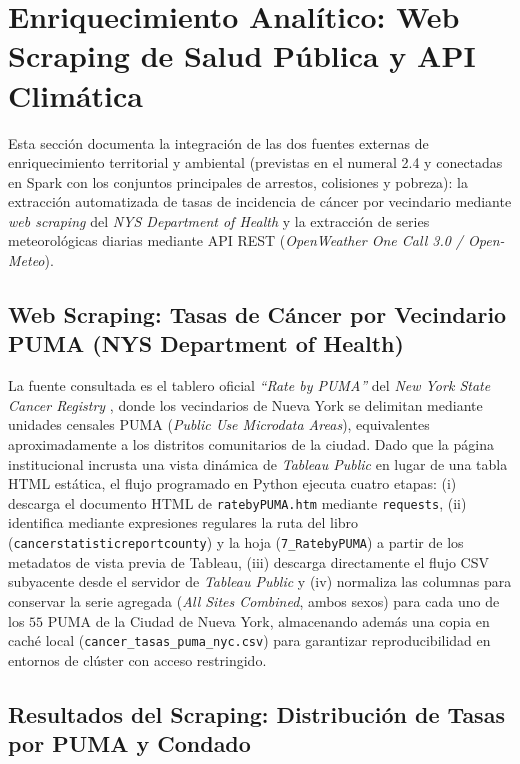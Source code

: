 \section{Enriquecimiento Analítico: Web Scraping de Salud Pública y API Climática}
\label{sec:bonos}

Esta sección documenta la integración de las dos fuentes externas de enriquecimiento territorial y ambiental (previstas en el numeral 2.4 y conectadas en Spark con los conjuntos principales de arrestos, colisiones y pobreza): la extracción automatizada de tasas de incidencia de cáncer por vecindario mediante \textit{web scraping} del \textit{NYS Department of Health} y la extracción de series meteorológicas diarias mediante API REST (\textit{OpenWeather One Call 3.0 / Open-Meteo}).

\subsection{Web Scraping: Tasas de Cáncer por Vecindario PUMA (NYS Department of Health)}
\label{subsec:bono_cancer}

La fuente consultada es el tablero oficial \textit{``Rate by PUMA''} del \textit{New York State Cancer Registry} \cite{nys_cancer_registry_2026}, donde los vecindarios de Nueva York se delimitan mediante unidades censales PUMA (\textit{Public Use Microdata Areas}), equivalentes aproximadamente a los distritos comunitarios de la ciudad. Dado que la página institucional incrusta una vista dinámica de \textit{Tableau Public} en lugar de una tabla HTML estática, el flujo programado en Python ejecuta cuatro etapas: (i) descarga el documento HTML de \texttt{ratebyPUMA.htm} mediante \texttt{requests}, (ii) identifica mediante expresiones regulares la ruta del libro (\texttt{cancerstatisticreportcounty}) y la hoja (\texttt{7\_RatebyPUMA}) a partir de los metadatos de vista previa de Tableau, (iii) descarga directamente el flujo CSV subyacente desde el servidor de \textit{Tableau Public} y (iv) normaliza las columnas para conservar la serie agregada (\textit{All Sites Combined}, ambos sexos) para cada uno de los $55$ PUMA de la Ciudad de Nueva York, almacenando además una copia en caché local (\texttt{cancer\_tasas\_puma\_nyc.csv}) para garantizar reproducibilidad en entornos de clúster con acceso restringido.

\subsection{Resultados del Scraping: Distribución de Tasas por PUMA y Condado}
\label{subsec:bono_puma}

